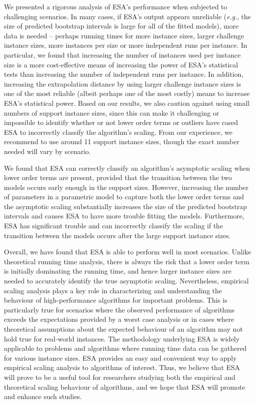 \documentclass[aic]{iosart2x}
\newcommand{\eg}{\emph{e.g.}}
\begin{document}
We presented a rigorous analysis of ESA's performance when subjected to challenging scenarios. In many cases, if ESA's output appears unreliable (\eg{}, the size of predicted bootstrap intervals is large for all of the fitted models), more data is needed -- perhaps running times for more instance sizes, larger challenge instance sizes, more instances per size or more independent runs per instance. In particular, we found that increasing the number of instances used per instance size is a more cost-effective means of increasing the power of ESA's statistical tests than increasing the number of independent runs per instance. In addition, increasing the extrapolation distance by using larger challenge instance sizes is one of the most reliable (albeit perhaps one of the most costly) means to increase ESA's statistical power. Based on our results, we also caution against using small numbers of support instance sizes, since this can make it challenging or impossible to identify whether or not lower order terms or outliers have cased ESA to incorrectly classify the algorithm's scaling. From our experience, we recommend to use around 11 support instance sizes, though the exact number needed will vary by scenario. 

We found that ESA can correctly classify an algorithm's asymptotic scaling when lower order terms are present, provided that the transition between the two models occurs early enough in the support sizes. However, increasing the number of parameters in a parametric model to capture both the lower order terms and the asymptotic scaling substantially increases the size of the predicted bootstrap intervals and causes ESA to have more trouble fitting the models. Furthermore, ESA has significant trouble and can incorrectly classify the scaling if the transition between the models occurs after the large support instance sizes. 

Overall, we have found that ESA is able to perform well in most scenarios. Unlike theoretical running time analysis, there is always the risk that a lower order term is initially dominating the running time, and hence larger instance sizes are needed to accurately identify the true asymptotic scaling. Nevertheless, empirical scaling analysis plays a key role in characterizing and understanding the behaviour of high-performance algorithms for important problems. This is particularly true for scenarios where the observed performance of algorithms exceeds the expectations provided by a worst case analysis or in cases where theoretical assumptions about the expected behaviour of an algorithm may not hold true for real-world instances. The methodology underlying ESA is widely applicable to problems and algorithms where running time data can be gathered for various instance sizes. ESA provides an easy and convenient way to apply empirical scaling analysis to algorithms of interest. Thus, we believe that ESA will prove to be a useful tool for researchers studying both the empirical and theoretical scaling behaviour of algorithms, and we hope that ESA will promote and enhance such studies.
\end{document}
